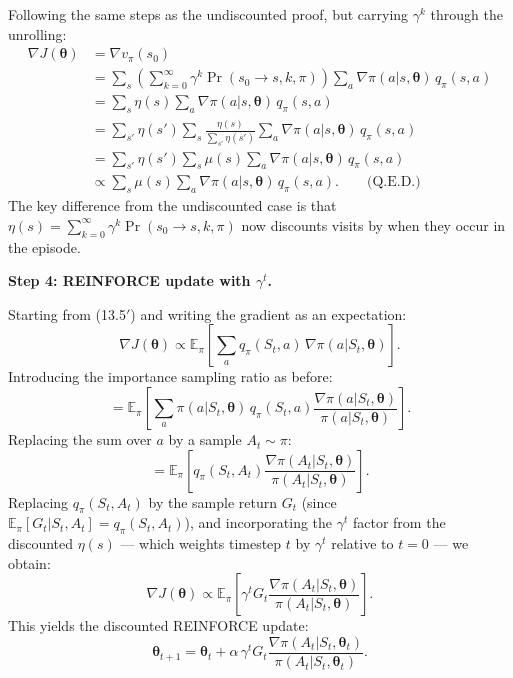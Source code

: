 \documentclass{article}
\begin{document}
Following the same steps as the undiscounted proof, but carrying $\gamma^k$ through the
unrolling:
\begin{align*}
  \nabla J(\boldsymbol{\theta})
  &= \nabla v_\pi(s_0) \\
  &= \sum_s \left(\sum_{k=0}^{\infty} \gamma^k \Pr(s_0 \to s, k, \pi)\right)
     \sum_a \nabla\pi(a|s, \boldsymbol{\theta})\, q_\pi(s, a) \\
  &= \sum_s \eta(s) \sum_a \nabla\pi(a|s, \boldsymbol{\theta})\, q_\pi(s, a) \\
  &= \sum_{s'} \eta(s') \sum_s \frac{\eta(s)}{\sum_{s'}\eta(s')}
     \sum_a \nabla\pi(a|s, \boldsymbol{\theta})\, q_\pi(s, a) \\
  &= \sum_{s'} \eta(s') \sum_s \mu(s)
     \sum_a \nabla\pi(a|s, \boldsymbol{\theta})\, q_\pi(s, a) \\
  &\propto \sum_s \mu(s) \sum_a \nabla\pi(a|s, \boldsymbol{\theta})\, q_\pi(s, a). \qquad \text{(Q.E.D.)}
\end{align*}
The key difference from the undiscounted case is that $\eta(s) = \sum_{k=0}^\infty \gamma^k
\Pr(s_0 \to s, k, \pi)$ now discounts visits by when they occur in the episode.

\bigskip

\textbf{Step 4: REINFORCE update with $\gamma^t$.}

Starting from (13.5$'$) and writing the gradient as an expectation:
\[
  \nabla J(\boldsymbol{\theta})
  \propto \mathbb{E}_\pi\!\left[
    \sum_a q_\pi(S_t, a)\, \nabla\pi(a|S_t, \boldsymbol{\theta})
  \right].
\]
Introducing the importance sampling ratio as before:
\[
  = \mathbb{E}_\pi\!\left[
    \sum_a \pi(a|S_t, \boldsymbol{\theta})\, q_\pi(S_t, a)
    \frac{\nabla\pi(a|S_t, \boldsymbol{\theta})}{\pi(a|S_t, \boldsymbol{\theta})}
  \right].
\]
Replacing the sum over $a$ by a sample $A_t \sim \pi$:
\[
  = \mathbb{E}_\pi\!\left[
    q_\pi(S_t, A_t) \frac{\nabla\pi(A_t|S_t, \boldsymbol{\theta})}{\pi(A_t|S_t, \boldsymbol{\theta})}
  \right].
\]
Replacing $q_\pi(S_t, A_t)$ by the sample return $G_t$ (since $\mathbb{E}_\pi[G_t | S_t, A_t]
= q_\pi(S_t, A_t)$), and incorporating the $\gamma^t$ factor from the discounted $\eta(s)$
— which weights timestep $t$ by $\gamma^t$ relative to $t=0$ — we obtain:
\[
  \nabla J(\boldsymbol{\theta})
  \propto \mathbb{E}_\pi\!\left[
    \gamma^t G_t \frac{\nabla\pi(A_t|S_t, \boldsymbol{\theta})}{\pi(A_t|S_t, \boldsymbol{\theta})}
  \right].
\]
This yields the discounted REINFORCE update:
\[
  \boxed{\boldsymbol{\theta}_{t+1} = \boldsymbol{\theta}_t
  + \alpha\, \gamma^t G_t \frac{\nabla\pi(A_t|S_t, \boldsymbol{\theta}_t)}{\pi(A_t|S_t, \boldsymbol{\theta}_t)}.}
  \tag{13.8$'$}
\]
\end{document}
